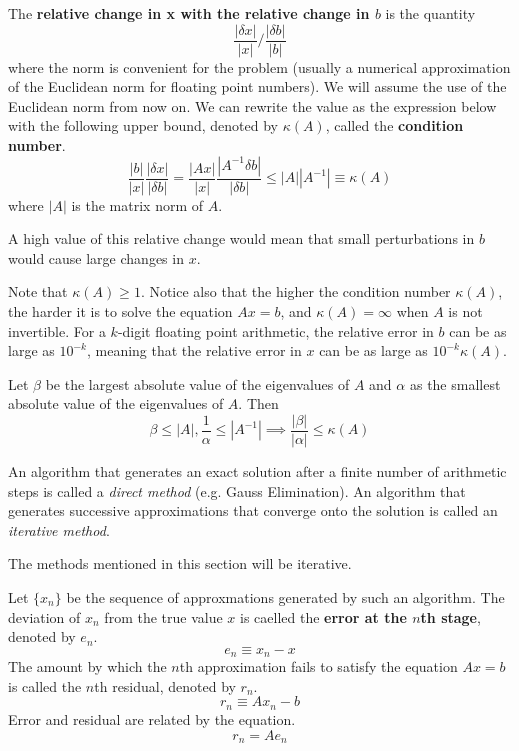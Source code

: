   \begin{definition}
    The \textbf{relative change in x with the relative change in $b$} is the quantity
    \begin{equation}
      \frac{|\delta x|}{|x|} \bigg/ \frac{|\delta b|}{|b|}
    \end{equation}
    where the norm is convenient for the problem (usually a numerical approximation of the Euclidean norm for floating point numbers). We will assume the use of the Euclidean norm from now on. We can rewrite the value as the expression below with the following upper bound, denoted by $\kappa (A)$, called the \textbf{condition number}. 
    \begin{equation}
      \frac{|b|}{|x|} \frac{|\delta x|}{|\delta b|} = \frac{|Ax|}{|x|} \frac{|A^{-1} \delta b|}{|\delta b|} \leq |A||A^{-1}| \equiv \kappa (A)
    \end{equation}
    where $|A|$ is the matrix norm of $A$. 
  \end{definition}

  A high value of this relative change would mean that small perturbations in $b$ would cause large changes in $x$.

  Note that $\kappa(A) \geq 1$. Notice also that the higher the condition number $\kappa (A)$, the harder it is to solve the equation $A x = b$, and $\kappa(A) = \infty$ when $A$ is not invertible. For a $k$-digit floating point arithmetic, the relative error in $b$ can be as large as $10^{-k}$, meaning that the relative error in $x$ can be as large as $10^{-k} \kappa (A)$. 

  Let $\beta$ be the largest absolute value of the eigenvalues of $A$ and $\alpha$ as the smallest absolute value of the eigenvalues of $A$. Then 
  \begin{equation}
    \beta \leq |A|, \frac{1}{\alpha} \leq |A^{-1}| \implies \frac{|\beta|}{|\alpha|} \leq \kappa(A)
  \end{equation}

  An algorithm that generates an exact solution after a finite number of arithmetic steps is called a \textit{direct method} (e.g. Gauss Elimination). An algorithm that generates successive approximations that converge onto the solution is called an \textit{iterative method}. 

  The methods mentioned in this section will be iterative. 

  \begin{definition}
    Let $\{ x_n\}$ be the sequence of approxmations generated by such an algorithm. The deviation of $x_n$ from the true value $x$ is caelled the \textbf{error at the $n$th stage}, denoted by $e_n$. 
    \[e_n \equiv x_n - x\]
    The amount by which the $n$th approximation fails to satisfy the equation $Ax = b$ is called the $n$th residual, denoted by $r_n$. 
    \[r_n \equiv A x_n - b\]
    Error and residual are related by the equation. 
    \[r_n = A e_n\]
  \end{definition}

